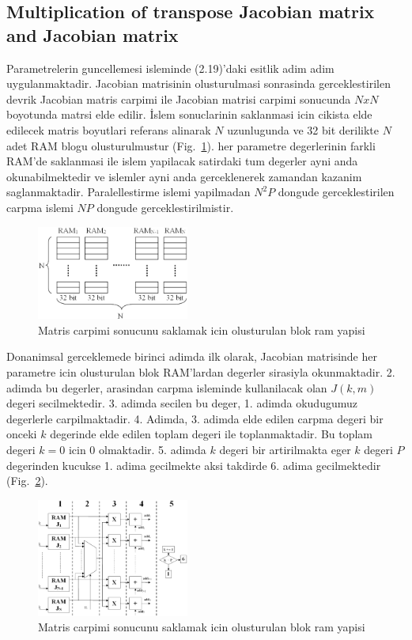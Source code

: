 \documentclass[]{interact}
\theoremstyle{plain}%
\theoremstyle{definition}
\theoremstyle{remark}
\begin{document}
\subsection{Multiplication of transpose Jacobian matrix and Jacobian matrix}
Parametrelerin guncellemesi isleminde (2.19)’daki esitlik adim adim uygulanmaktadir. Jacobian matrisinin olusturulmasi sonrasinda gerceklestirilen devrik Jacobian matris carpimi ile Jacobian matrisi carpimi sonucunda $NxN$ boyotunda matrsi elde edilir. İslem sonuclarinin saklanmasi icin cikista elde edilecek matris boyutlari referans alinarak  $N$ uzunlugunda ve 32 bit derilikte $N$ adet RAM blogu olusturulmustur (Fig.~\ref{fig:trans_carpim}). her parametre degerlerinin farkli RAM'de saklanmasi ile islem yapilacak satirdaki tum degerler ayni anda okunabilmektedir ve islemler ayni anda gerceklenerek zamandan kazanim saglanmaktadir. Paralellestirme islemi yapilmadan $N^2P$ dongude gerceklestirilen carpma islemi $NP$ dongude gerceklestirilmistir.


\begin{figure}[h]
  \centering
  \includegraphics[width=5cm]{transpoze_carpim}

  \caption{Matris carpimi sonucunu saklamak icin olusturulan blok ram yapisi}
  \label{fig:trans_carpim}
\end{figure}


Donanimsal gerceklemede birinci adimda ilk olarak, Jacobian matrisinde her parametre icin olusturulan blok RAM’lardan degerler sirasiyla okunmaktadir. 2. adimda bu degerler, arasindan carpma isleminde kullanilacak olan $J(k,m)$ degeri secilmektedir. 3. adimda secilen bu deger, 1. adimda okudugumuz degerlerle carpilmaktadir.  4. Adimda, 3. adimda elde edilen carpma degeri bir onceki $k$ degerinde elde edilen toplam degeri ile toplanmaktadir. Bu toplam degeri $k=0$  icin $0$ olmaktadir. 5. adimda $k$  degeri bir artirilmakta eger    $k$ degeri $P$  degerinden kucukse 1. adima gecilmekte aksi takdirde 6. adima gecilmektedir (Fig.~\ref{fig:multip_1}).


\begin{figure}[h]
  \centering
  \includegraphics[width=5cm]{multip_1}

  \caption{Matris carpimi sonucunu saklamak icin olusturulan blok ram yapisi}
  \label{fig:multip_1}
\end{figure}
\end{document}

